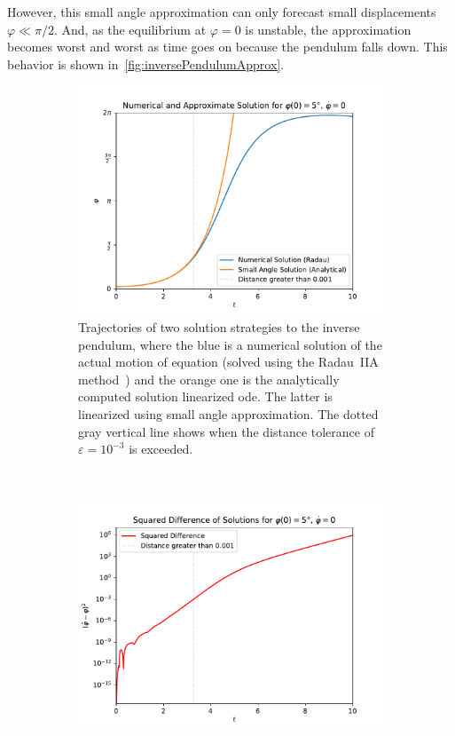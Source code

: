 			However, this small angle approximation can only forecast small displacements \( \varphi \ll \pi/2 \). And, as the equilibrium at \( \varphi = 0 \) is unstable, the approximation becomes worst and worst as time goes on because the pendulum falls down. This behavior is shown in~\autoref{fig:inversePendulumApprox}.

			\begin{figure}
				\centering
				\begin{subfigure}[t]{0.5\linewidth}
					\centering
					\includegraphics[width = \linewidth]{figures/introduction/generated/pendulum-motion-solutions}
					\caption{Trajectories of two solution strategies to the inverse pendulum, where the blue is a numerical solution of the actual motion of equation (solved using the Radau~IIA method~\cite[72]{hairerSolvingOrdinaryDifferential1996}) and the orange one is the analytically computed solution linearized \ac{ode}. The latter is linearized using small angle approximation. The dotted gray vertical line shows when the distance tolerance of \( \varepsilon = 10^{-3} \) is exceeded.}
				\end{subfigure}%
				~
				\begin{subfigure}[t]{0.5\linewidth}
					\centering
					\includegraphics[width = \linewidth]{figures/introduction/generated/pendulum-motion-difference}

\end{subfigure}
\end{figure}
